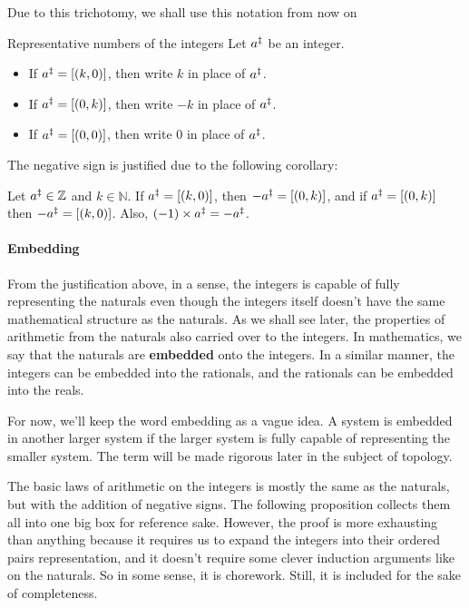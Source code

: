 Due to this trichotomy, we shall use this notation from now on
\begin{df}{Representative numbers of the integers}{}
  Let \(a^{\ddagger}\) be an integer.
  \begin{itemize}[noitemsep]
    \item If \(a^{\ddagger} = [(k, 0)]\), then write \(k\) in place of \(a^{\ddagger}\).
    \item If \(a^{\ddagger} = [(0, k)]\), then write \(-k\) in place of \(a^{\ddagger}\).
    \item If \(a^{\ddagger} = [(0, 0)]\), then write \(0\) in place of \(a^{\ddagger}\).
  \end{itemize}
\end{df}
The negative sign is justified due to the following corollary:
\begin{cor}{}{}
  Let \(a^{\ddagger} \in \mathbb{Z}\) and \(k \in \mathbb{N}\). If \(a^{\ddagger} = [(k, 0)]\), then
  \(-a^{\ddagger} = [(0, k)]\), and if \(a^{\ddagger} = [(0, k)]\) then \(-a^{\ddagger} = [(k, 0)]\). Also,
  \((-1) \times a^{\ddagger} = -a^{\ddagger}\).
\end{cor}

\paragraph{Embedding}

From the justification above, in a sense, the integers is capable of fully representing the naturals
even though the integers itself doesn't have the same mathematical structure as the naturals. As we
shall see later, the properties of arithmetic from the naturals also carried over to the integers.
In mathematics, we say that the naturals are \textbf{embedded} onto the integers. In a similar
manner, the integers can be embedded into the rationals, and the rationals can be embedded into the
reals.

For now, we'll keep the word embedding as a vague idea. A system is embedded in another larger
system if the larger system is fully capable of representing the smaller system. The term will be
made rigorous later in the subject of topology.

The basic laws of arithmetic on the integers is mostly the same as the naturals, but with the
addition of negative signs. The following proposition collects them all into one big box for
reference sake. However, the proof is more exhausting than anything because it requires us to expand
the integers into their ordered pairs representation, and it doesn't require some clever induction
arguments like on the naturals. So in some sense, it is chorework. Still, it is included for the
sake of completeness.


